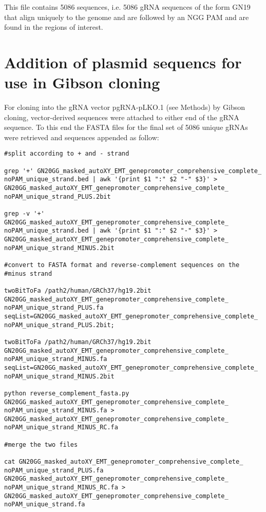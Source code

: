 This file contains 5086 sequences, i.e. 5086 gRNA sequences of the form GN19 that align uniquely to the genome and are followed by an NGG PAM and are found in the regions of interest.

\section{Addition of plasmid sequencs for use in Gibson cloning}
For cloning into the gRNA vector pgRNA-pLKO.1 (see Methods) by Gibson cloning, vector-derived sequences were attached to either end of the gRNA sequence. To this end the FASTA files for the final set of 5086 unique gRNAs were retrieved and sequences appended as follow:

\begin{small}\begin{lstlisting}
#split according to + and - strand 

grep '+' GN20GG_masked_autoXY_EMT_genepromoter_comprehensive_complete_ noPAM_unique_strand.bed | awk '{print $1 ":" $2 "-" $3}' > GN20GG_masked_autoXY_EMT_genepromoter_comprehensive_complete_ noPAM_unique_strand_PLUS.2bit

grep -v '+' GN20GG_masked_autoXY_EMT_genepromoter_comprehensive_complete_ noPAM_unique_strand.bed | awk '{print $1 ":" $2 "-" $3}' > GN20GG_masked_autoXY_EMT_genepromoter_comprehensive_complete_ noPAM_unique_strand_MINUS.2bit

#convert to FASTA format and reverse-complement sequences on the 
#minus strand

twoBitToFa /path2/human/GRCh37/hg19.2bit GN20GG_masked_autoXY_EMT_genepromoter_comprehensive_complete_ noPAM_unique_strand_PLUS.fa seqList=GN20GG_masked_autoXY_EMT_genepromoter_comprehensive_complete_ noPAM_unique_strand_PLUS.2bit;

twoBitToFa /path2/human/GRCh37/hg19.2bit GN20GG_masked_autoXY_EMT_genepromoter_comprehensive_complete_ noPAM_unique_strand_MINUS.fa seqList=GN20GG_masked_autoXY_EMT_genepromoter_comprehensive_complete_ noPAM_unique_strand_MINUS.2bit

python reverse_complement_fasta.py GN20GG_masked_autoXY_EMT_genepromoter_comprehensive_complete_ noPAM_unique_strand_MINUS.fa > GN20GG_masked_autoXY_EMT_genepromoter_comprehensive_complete_ noPAM_unique_strand_MINUS_RC.fa

#merge the two files

cat GN20GG_masked_autoXY_EMT_genepromoter_comprehensive_complete_
noPAM_unique_strand_PLUS.fa GN20GG_masked_autoXY_EMT_genepromoter_comprehensive_complete_
noPAM_unique_strand_MINUS_RC.fa > GN20GG_masked_autoXY_EMT_genepromoter_comprehensive_complete_
noPAM_unique_strand.fa


\end{lstlisting}
\end{small}
